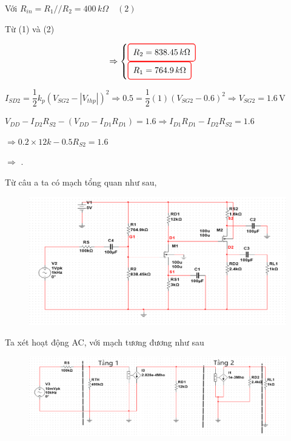 	Với \( R_{in} = R_1 // R_2 = 400\,k\Omega \quad (2) \)
	
	Từ (1) và (2) 
	
	\[\Rightarrow 
	\begin{cases}
		\finalresult{R_2 = 838.45\,k\Omega} \\
		\finalresult{R_1 = 764.9\,k\Omega}
	\end{cases}
	\]


	\( I_{SD2} = \dfrac{1}{2} k_p (V_{SG2} - |V_{thp}|)^2 
	\Rightarrow 0.5 = \dfrac{1}{2} (1) (V_{SG2} - 0.6)^2 
	\Rightarrow V_{SG2} = 1.6\,\text{V} \)
	
	\( V_{DD} - I_{D2} R_{S2} - (V_{DD} - I_{D1} R_{D1}) = 1.6 
	\Rightarrow I_{D1} R_{D1} - I_{D2} R_{S2} = 1.6 \)
	
	\( \Rightarrow 0.2 \times 12k - 0.5 R_{S2} = 1.6 \)
	
	$\Rightarrow $ .


Từ câu a ta có mạch tổng quan như sau,

\begin{figure}[H]
	\centering
	\includegraphics[width=.8\linewidth]{./my-chapters/my-images/Question8/b_tongquan.png}
\end{figure}

Ta xét hoạt động AC, với mạch tương đương như sau

\begin{figure}[H]
	\centering
	\includegraphics[width=.8\linewidth]{./my-chapters/my-images/Question8/b_mohinhtuongduong.png}
\end{figure}

